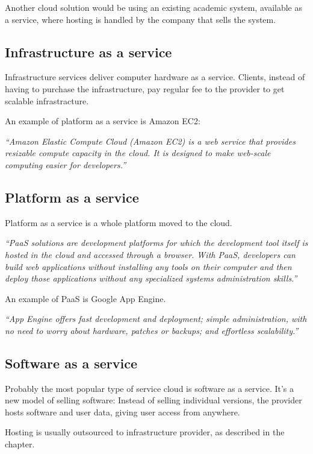 Another cloud solution would be using an existing academic system, available as a service, where hosting is handled by the company that sells the system. 

\subsection{Infrastructure as a service}

Infrastructure services deliver computer hardware as a service. Clients, instead of having to purchase the infrastructure, pay regular fee to the provider to get scalable infrastracture.

An example of platform as a service is Amazon EC2:

\emph{``Amazon Elastic Compute Cloud (Amazon EC2) is a web service that provides resizable compute capacity in the cloud. It is designed to make web-scale computing easier for developers.''} \citep{amazon}

\subsection{Platform as a service}

Platform as a service is a whole platform moved to the cloud. 

\emph{``PaaS solutions are development platforms for which the development tool itself is hosted in the cloud and accessed through a browser. With PaaS, developers can build web applications without installing any tools on their computer and then deploy those applications without any specialized systems administration skills.''} \citep{paas}

An example of PaaS is Google App Engine.

\emph{``App Engine offers fast development and deployment; simple administration, with no need to worry about hardware, patches or backups; and effortless scalability.''} \citep{google_appengine}

\subsection{Software as a service}

Probably the most popular type of service cloud is software as a service. It’s a new model of selling software: Instead of selling individual versions, the provider hosts software and user data, giving user access from anywhere.

Hosting is usually outsourced to infrastructure provider, as described in the chapter. 